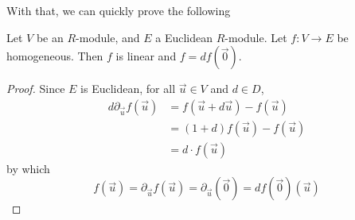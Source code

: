 With that, we can quickly prove the following

\begin{proposition}
  Let \( V \) be an \( R \)-module, and \( E \) a Euclidean \( R \)-module. Let \( f:V\to E \) be homogeneous. Then \( f \) is linear and \( f = df(\vec 0) \).
  \label{prop:homg}
\end{proposition}

\begin{proof}
  Since \( E \) is Euclidean, for all \( \vec u\in V \) and \( d\in D \),
  \begin{align*}
    d\partial_{\vec u}f(\vec u) &= f(\vec u + d\vec u) - f(\vec u) \\
                                &= (1+d)f(\vec u) - f(\vec u)      \\
				&= d\cdot f(\vec u)
  \end{align*}
  by which
  \begin{equation*}
    f(\vec u) = \partial_{\vec u}f(\vec u) = \partial_{\vec u}(\vec 0) = df(\vec 0 )(\vec u)
  \end{equation*} 
\end{proof}

